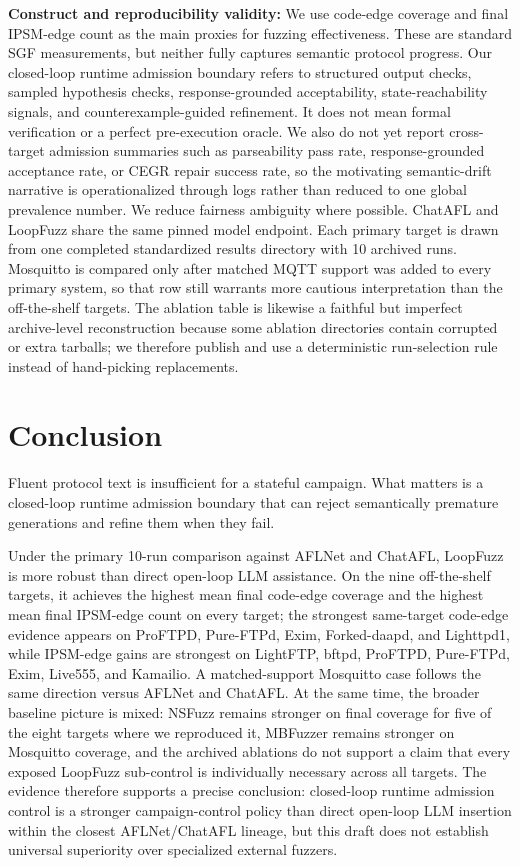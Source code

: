 \documentclass[conference]{IEEEtran}
\begin{document}
\textbf{Construct and reproducibility validity:} We use code-edge coverage and final IPSM-edge count as the main proxies for fuzzing effectiveness. These are standard SGF measurements, but neither fully captures semantic protocol progress. Our closed-loop runtime admission boundary refers to structured output checks, sampled hypothesis checks, response-grounded acceptability, state-reachability signals, and counterexample-guided refinement. It does not mean formal verification or a perfect pre-execution oracle. We also do not yet report cross-target admission summaries such as parseability pass rate, response-grounded acceptance rate, or CEGR repair success rate, so the motivating semantic-drift narrative is operationalized through logs rather than reduced to one global prevalence number. We reduce fairness ambiguity where possible. ChatAFL and LoopFuzz share the same pinned model endpoint. Each primary target is drawn from one completed standardized results directory with 10 archived runs. Mosquitto is compared only after matched MQTT support was added to every primary system, so that row still warrants more cautious interpretation than the off-the-shelf targets. The ablation table is likewise a faithful but imperfect archive-level reconstruction because some ablation directories contain corrupted or extra tarballs; we therefore publish and use a deterministic run-selection rule instead of hand-picking replacements.

\section{Conclusion}
Fluent protocol text is insufficient for a stateful campaign. What matters is a closed-loop runtime admission boundary that can reject semantically premature generations and refine them when they fail.

Under the primary 10-run comparison against AFLNet and ChatAFL, LoopFuzz is more robust than direct open-loop LLM assistance. On the nine off-the-shelf targets, it achieves the highest mean final code-edge coverage and the highest mean final IPSM-edge count on every target; the strongest same-target code-edge evidence appears on ProFTPD, Pure-FTPd, Exim, Forked-daapd, and Lighttpd1, while IPSM-edge gains are strongest on LightFTP, bftpd, ProFTPD, Pure-FTPd, Exim, Live555, and Kamailio. A matched-support Mosquitto case follows the same direction versus AFLNet and ChatAFL. At the same time, the broader baseline picture is mixed: NSFuzz remains stronger on final coverage for five of the eight targets where we reproduced it, MBFuzzer remains stronger on Mosquitto coverage, and the archived ablations do not support a claim that every exposed LoopFuzz sub-control is individually necessary across all targets. The evidence therefore supports a precise conclusion: closed-loop runtime admission control is a stronger campaign-control policy than direct open-loop LLM insertion within the closest AFLNet/ChatAFL lineage, but this draft does not establish universal superiority over specialized external fuzzers.



\end{document}
